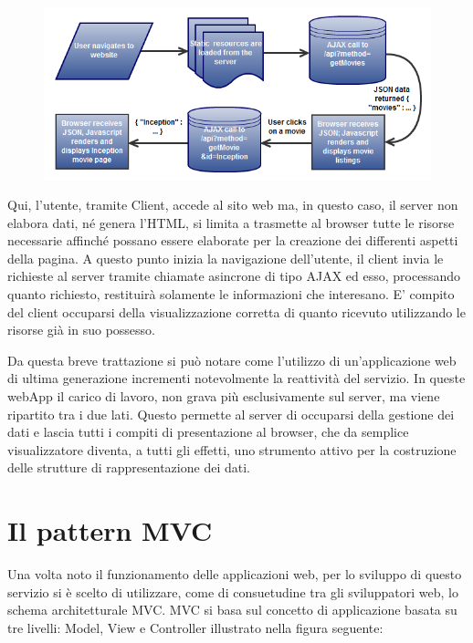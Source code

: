 \begin{figure}[htbp]
\begin{center}
\includegraphics{contents/images/web_app_flow_3_1_}
\end{center}
\caption{}
\label{fig:dessin}
\end{figure}

Qui, l’utente, tramite Client, accede al sito web ma, in questo caso, il server non elabora dati, né genera l’HTML, si limita a trasmette al browser tutte le risorse necessarie affinché possano essere elaborate per la creazione dei differenti aspetti della pagina. A questo punto inizia la navigazione dell’utente, il client invia le richieste al server tramite chiamate asincrone di tipo AJAX ed esso, processando quanto richiesto, restituirà solamente le informazioni che interesano. E’ compito del client occuparsi della visualizzazione corretta di quanto ricevuto utilizzando le risorse già in suo possesso.

Da questa breve trattazione si può notare come l’utilizzo di un’applicazione web di ultima generazione incrementi notevolmente la reattività del servizio. In queste webApp il carico di lavoro, non grava più esclusivamente sul server, ma viene ripartito tra i due lati. Questo permette al server di occuparsi della gestione dei dati e lascia tutti i compiti di presentazione al browser, che da semplice visualizzatore diventa, a tutti gli effetti, uno strumento attivo per la costruzione delle strutture di rappresentazione dei dati.


\section{Il pattern MVC} %
\label{sec:il_pattern_mvc}

Una volta noto il funzionamento delle applicazioni web, per lo sviluppo di questo servizio si è scelto di utilizzare, come di consuetudine tra gli sviluppatori web, lo schema architetturale MVC.
MVC si basa sul concetto di applicazione basata su tre livelli: Model, View e Controller illustrato nella figura seguente:


